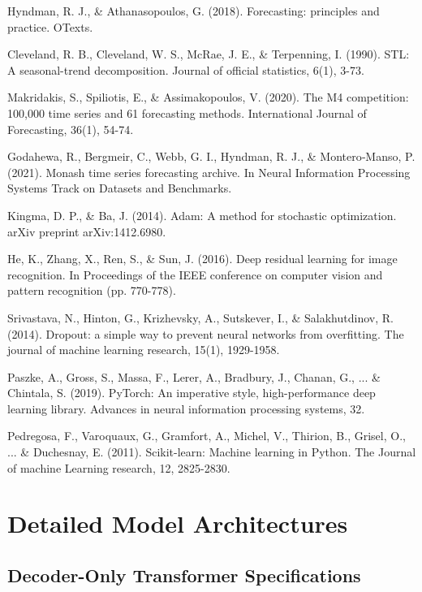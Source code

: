 \documentclass[11pt]{article}
\begin{document}
\begin{thebibliography}{99}
Hyndman, R. J., \& Athanasopoulos, G. (2018). Forecasting: principles and practice. OTexts.

Cleveland, R. B., Cleveland, W. S., McRae, J. E., \& Terpenning, I. (1990). STL: A seasonal-trend decomposition. Journal of official statistics, 6(1), 3-73.

Makridakis, S., Spiliotis, E., \& Assimakopoulos, V. (2020). The M4 competition: 100,000 time series and 61 forecasting methods. International Journal of Forecasting, 36(1), 54-74.

Godahewa, R., Bergmeir, C., Webb, G. I., Hyndman, R. J., \& Montero‐Manso, P. (2021). Monash time series forecasting archive. In Neural Information Processing Systems Track on Datasets and Benchmarks.

Kingma, D. P., \& Ba, J. (2014). Adam: A method for stochastic optimization. arXiv preprint arXiv:1412.6980.

He, K., Zhang, X., Ren, S., \& Sun, J. (2016). Deep residual learning for image recognition. In Proceedings of the IEEE conference on computer vision and pattern recognition (pp. 770-778).

Srivastava, N., Hinton, G., Krizhevsky, A., Sutskever, I., \& Salakhutdinov, R. (2014). Dropout: a simple way to prevent neural networks from overfitting. The journal of machine learning research, 15(1), 1929-1958.

Paszke, A., Gross, S., Massa, F., Lerer, A., Bradbury, J., Chanan, G., ... \& Chintala, S. (2019). PyTorch: An imperative style, high-performance deep learning library. Advances in neural information processing systems, 32.

Pedregosa, F., Varoquaux, G., Gramfort, A., Michel, V., Thirion, B., Grisel, O., ... \& Duchesnay, E. (2011). Scikit-learn: Machine learning in Python. The Journal of machine Learning research, 12, 2825-2830.

\end{thebibliography}

\appendix

\section{Detailed Model Architectures}

\subsection{Decoder-Only Transformer Specifications}
\end{document}
